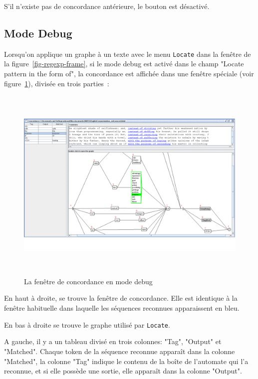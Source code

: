 \bigskip
\noindent S'il n'existe pas de concordance antérieure, le bouton est désactivé.

\subsection{Mode Debug}
\label{section-debug-mode}
Lorsqu'on applique un graphe à un texte avec le menu \verb+Locate+ dans la fenêtre de la
figure~\ref{fig-regexp-frame}, si le mode debug est activé dans le champ "Locate pattern in the
form of", la concordance est affichée dans une fenêtre spéciale (voir figure~\ref{fig-debug-mode}),
divisée en trois parties~:

\begin{figure}[h]
\begin{center}
\includegraphics[height=9.5cm]{resources/img/fig6-34.png}
\caption{La fenêtre de concordance en mode debug\label{fig-debug-mode}}
\end{center}
\end{figure}

\medskip 
\indent En haut à droite, se trouve la fenêtre de concordance. Elle est identique à la fenêtre habituelle dans laquelle les séquences reconnues apparaissent en bleu.

\medskip
\indent En bas à droite se trouve le graphe utilisé par \verb+Locate+.

\medskip
\indent A gauche, il y a un tableau divisé en trois colonnes: "Tag", "Output" et "Matched".
Chaque token de la séquence reconnue apparaît dans la colonne "Matched", la colonne "Tag" indique le
contenu de la boîte de l'automate qui l'a reconnue, et si elle possède une sortie, elle apparaît
dans la colonne "Output".

